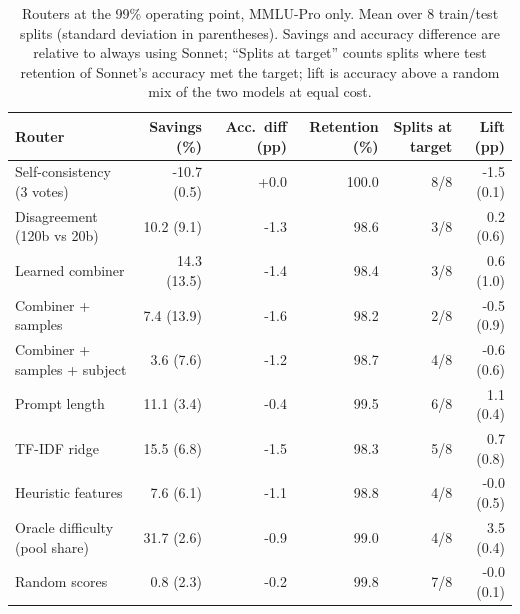 \begin{table}[!htbp]
\centering\small
\caption{Routers at the 99\% operating point, MMLU-Pro only. Mean over 8 train/test splits (standard deviation in parentheses). Savings and accuracy difference are relative to always using Sonnet; ``Splits at target'' counts splits where test retention of Sonnet's accuracy met the target; lift is accuracy above a random mix of the two models at equal cost.}\label{tab:99_mmlu}
\begin{tabular}{lrrrrr}
\toprule
Router & Savings (\%) & Acc.\ diff (pp) & Retention (\%) & Splits at target & Lift (pp) \\
\midrule
Self-consistency (3 votes) & -10.7 (0.5) & +0.0 & 100.0 & 8/8 & -1.5 (0.1) \\
Disagreement (120b vs 20b) & 10.2 (9.1) & -1.3 & 98.6 & 3/8 & 0.2 (0.6) \\
Learned combiner & 14.3 (13.5) & -1.4 & 98.4 & 3/8 & 0.6 (1.0) \\
Combiner + samples & 7.4 (13.9) & -1.6 & 98.2 & 2/8 & -0.5 (0.9) \\
Combiner + samples + subject & 3.6 (7.6) & -1.2 & 98.7 & 4/8 & -0.6 (0.6) \\
Prompt length & 11.1 (3.4) & -0.4 & 99.5 & 6/8 & 1.1 (0.4) \\
TF-IDF ridge & 15.5 (6.8) & -1.5 & 98.3 & 5/8 & 0.7 (0.8) \\
Heuristic features & 7.6 (6.1) & -1.1 & 98.8 & 4/8 & -0.0 (0.5) \\
Oracle difficulty (pool share) & 31.7 (2.6) & -0.9 & 99.0 & 4/8 & 3.5 (0.4) \\
Random scores & 0.8 (2.3) & -0.2 & 99.8 & 7/8 & -0.0 (0.1) \\
\bottomrule
\end{tabular}
\end{table}
